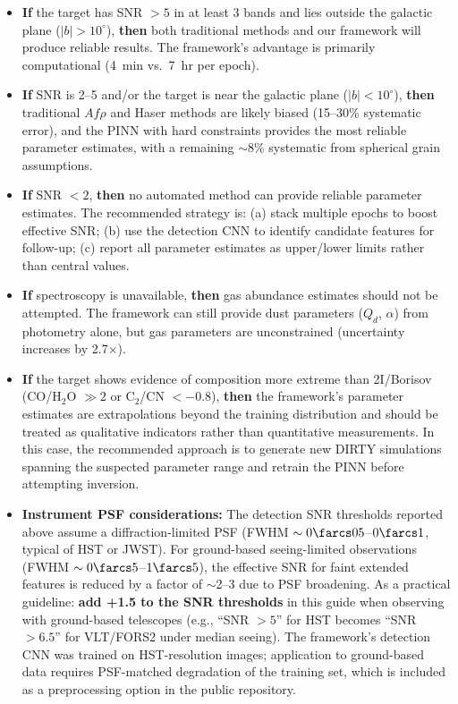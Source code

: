 \documentclass[usenatbib]{mnras}
\begin{document}
\begin{itemize}
    \item \textbf{If} the target has SNR $>5$ in at least 3 bands and lies outside the galactic plane ($|b| > 10^\circ$), \textbf{then} both traditional methods and our framework will produce reliable results. The framework's advantage is primarily computational (4~min vs.\ 7~hr per epoch).

    \item \textbf{If} SNR is 2--5 and/or the target is near the galactic plane ($|b| < 10^\circ$), \textbf{then} traditional $Af\rho$ and Haser methods are likely biased (15--30\% systematic error), and the PINN with hard constraints provides the most reliable parameter estimates, with a remaining $\sim$8\% systematic from spherical grain assumptions.

    \item \textbf{If} SNR $<2$, \textbf{then} no automated method can provide reliable parameter estimates. The recommended strategy is: (a) stack multiple epochs to boost effective SNR; (b) use the detection CNN to identify candidate features for follow-up; (c) report all parameter estimates as upper/lower limits rather than central values.

    \item \textbf{If} spectroscopy is unavailable, \textbf{then} gas abundance estimates should not be attempted. The framework can still provide dust parameters ($Q_d$, $\alpha$) from photometry alone, but gas parameters are unconstrained (uncertainty increases by 2.7$\times$).

    \item \textbf{If} the target shows evidence of composition more extreme than 2I/Borisov (CO/H$_2$O $\gg 2$ or C$_2$/CN $<-0.8$), \textbf{then} the framework's parameter estimates are extrapolations beyond the training distribution and should be treated as qualitative indicators rather than quantitative measurements. In this case, the recommended approach is to generate new DIRTY simulations spanning the suspected parameter range and retrain the PINN before attempting inversion.
    \item \textbf{Instrument PSF considerations:} The detection SNR thresholds reported above assume a diffraction-limited PSF (FWHM $\sim 0\farcs05$--$0\farcs1$, typical of HST or JWST). For ground-based seeing-limited observations (FWHM $\sim 0\farcs5$--$1\farcs5$), the effective SNR for faint extended features is reduced by a factor of $\sim$2--3 due to PSF broadening. As a practical guideline: \textbf{add +1.5 to the SNR thresholds} in this guide when observing with ground-based telescopes (e.g., ``SNR $>5$'' for HST becomes ``SNR $>6.5$'' for VLT/FORS2 under median seeing). The framework's detection CNN was trained on HST-resolution images; application to ground-based data requires PSF-matched degradation of the training set, which is included as a preprocessing option in the public repository.
\end{itemize}
\end{document}
